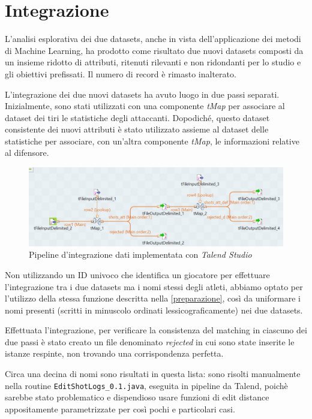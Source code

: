 \section{Integrazione}
\label{integrazione}

L’analisi esplorativa dei due datasets, anche in vista dell’applicazione dei metodi di Machine Learning, ha prodotto come risultato due nuovi datasets composti da un insieme ridotto di attributi, ritenuti rilevanti e non ridondanti per lo studio e gli obiettivi prefissati. Il numero di record è rimasto inalterato.
\par
L’integrazione dei due nuovi datasets ha avuto luogo in due passi separati. Inizialmente, sono stati utilizzati con una componente \textit{tMap} per associare al dataset dei tiri le statistiche degli attaccanti. Dopodiché, questo dataset consistente dei nuovi attributi è stato utilizzato assieme al dataset delle statistiche per associare, con un'altra componente \textit{tMap}, le informazioni relative al difensore.
\par
\begin{figure}[H]
\caption{Pipeline d'integrazione dati implementata con \textit{Talend Studio}}
	\includegraphics[width=\linewidth]{pipeline_talend1.png}
\end{figure}

Non utilizzando un ID univoco che identifica un giocatore per effettuare l’integrazione tra i due datasets ma i nomi stessi degli atleti, abbiamo optato per l’utilizzo della stessa funzione descritta nella \autoref{preparazione}, così da uniformare i nomi presenti (scritti in minuscolo ordinati lessicograficamente) nei due datasets. 
\par

Effettuata l’integrazione, per verificare la consistenza del matching in ciascuno dei due passi è stato creato un file denominato \textit{rejected} in cui sono state inserite le istanze respinte, non trovando una corrispondenza perfetta.
\par
Circa una decina di nomi sono risultati in questa lista: sono risolti manualmente nella routine \texttt{EditShotLogs\_0.1.java}, eseguita in pipeline da Talend, poichè sarebbe stato problematico e dispendioso usare funzioni di edit distance appositamente parametrizzate per così pochi e particolari casi.


